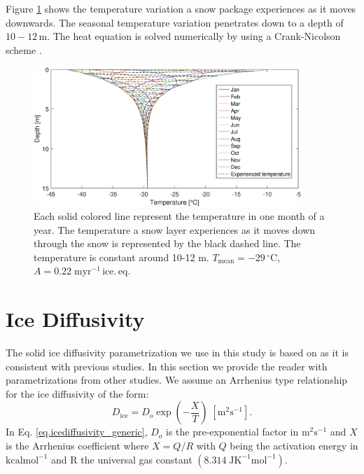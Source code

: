 \documentclass[11pt, draftcls, onecolumn]{IEEEtran} %
\numberwithin{equation}{section}
\numberwithin{table}{section}
\numberwithin{figure}{section}
\begin{document}
\begin{appendices}
Figure \ref{fig:firn_temp_profle} shows the temperature variation a snow package experiences as it moves downwards.
The seasonal temperature variation penetrates down to a depth of $10-12\, \mathrm{m}$. 
The heat equation is solved numerically by using a Crank-Nicolson scheme \citep{durran}.
\begin{figure}[]
	\vspace*{2mm}
	\begin{center}
		\includegraphics[width=0.9\textwidth]{firn_temp_profile.eps}
		\caption{Each solid colored line represent the temperature in one month of a year. 
			The temperature a snow layer experiences as it moves down through the snow
			is represented by the black dashed line. 
			The temperature is constant around 10-12 m. $T_{\mathrm{mean}} = -29 \,^{\circ} \mathrm{C}$,
			$A = 0.22 \;\mathrm{myr^{-1}\,ice.\, eq.}$}  \label{fig:firn_temp_profle}
	\end{center}
\end{figure}


\section{Ice Diffusivity} \label{sec:appendix_ice_diffusion}
The solid ice diffusivity parametrization we use in this study is based on \cite{Ramseier1967} 
as it is consistent with previous studies.
In this section we provide the reader with parametrizations from other studies. 
We assume an Arrhenius type relationship for the ice diffusivity of the form:
\begin{equation}
D_{\mathrm{ice}} = D_o \exp \left(- \frac{X}{T} \right) \;\mathrm{ [m^2 s^{-1}]} . 
\label{eq.icediffusivity_generic}
\end{equation}
In Eq. \ref{eq.icediffusivity_generic}, $D_o$ is the pre-exponential factor in $\mathrm{m^2s^{-1}}$
and $X$ is the Arrhenius coefficient where $X = Q/R$ with $Q$ being the activation energy in 
$\mathrm{kcalmol^{-1}}$ and R the universal gas constant $(8.314 \; \mathrm{JK^{-1}mol^{-1}})$.


\end{appendices}
\end{document}
